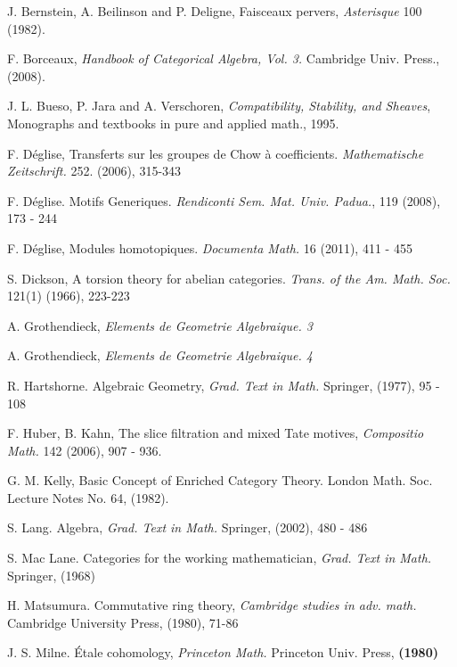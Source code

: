 \newpage

\begin{thebibliography}{10}

J. Bernstein, A. Beilinson and P. Deligne,
Faisceaux pervers, {\em Asterisque} 100 (1982).

F. Borceaux,
{\em Handbook of Categorical Algebra, Vol. 3.}
Cambridge Univ. Press., (2008).

J. L. Bueso, P. Jara and A. Verschoren,
{\em Compatibility, Stability, and Sheaves}, 
Monographs and textbooks in pure and applied math.,
1995.

F. D\'eglise,
Transferts sur les groupes de Chow \`a coefficients.
{\em Mathematische Zeitschrift.} 252. (2006), 315-343

F. D\'eglise.
Motifs Generiques.
\emph{Rendiconti Sem. Mat. Univ. Padua.}, 119 (2008), 173 - 244

F. D\'eglise, 
Modules homotopiques.
{\em Documenta Math.}
16 (2011), 411 - 455

S. Dickson,
A torsion theory for abelian categories.
{\em Trans. of the Am. Math. Soc.} 121(1) (1966), 223-223

A. Grothendieck,
{\em Elements de Geometrie Algebraique. 3}

A. Grothendieck,
{\em Elements de Geometrie Algebraique. 4}

R. Hartshorne.
Algebraic Geometry, {\em Grad. Text in Math.}
Springer, (1977), 95 - 108

F. Huber, B. Kahn, The slice filtration and mixed Tate motives,
{\em Compositio Math.} 142 (2006), 907 - 936.

G. M. Kelly, Basic Concept of Enriched Category Theory.
London Math. Soc. Lecture Notes No. 64, (1982).

S. Lang.
Algebra, {\em Grad. Text in Math.}
Springer, (2002), 480 - 486

S. Mac Lane.
Categories for the working mathematician, {\em Grad. Text in Math.}
Springer, (1968)

H. Matsumura.
Commutative ring theory, {\em Cambridge studies in adv. math.}
Cambridge University Press, (1980), 71-86

J. S. Milne.
\'Etale cohomology, {\em Princeton Math.}
Princeton Univ. Press, \textbf{(1980)}


\end{thebibliography}

